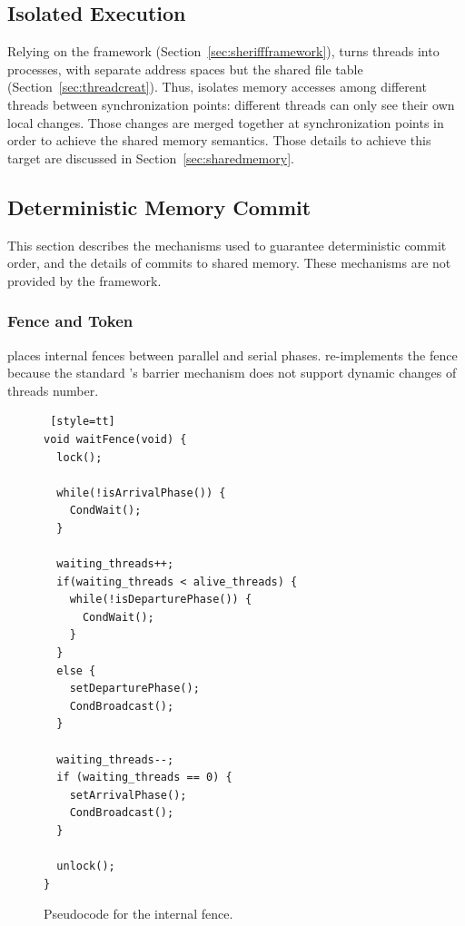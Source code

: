 \subsection{Isolated Execution}
\label{sec:threadsasprocs}

Relying on the \sheriff{} framework (Section~\ref{sec:sheriffframework}), \dthreads{} turns threads into processes, with separate address spaces but the shared file table (Section~\ref{sec:threadcreat}). Thus, \dthreads{} isolates memory accesses among different threads between synchronization points: different threads can only see their own local changes. Those changes are merged together at synchronization points in order to achieve the shared memory semantics. Those details to achieve this target are discussed in Section~\ref{sec:sharedmemory}.  

\subsection{Deterministic Memory Commit}
\label{sec:sharedmem}

This section describes the mechanisms used to guarantee deterministic commit order, and the details of commits to shared memory. These mechanisms are not provided by the \sheriff{} framework.   

\subsubsection{Fence and Token}
\label{sec:schedule}

\dthreads{} places internal fences between parallel and serial phases. \dthreads{} re-implements the fence because the standard \pthreads{}'s barrier mechanism does not support dynamic changes of threads number. 

\begin{figure}
\begin{lstlisting} [style=tt]
void waitFence(void) {
  lock();
	
  while(!isArrivalPhase()) { 
    CondWait();
  }

  waiting_threads++;
  if(waiting_threads < alive_threads) {
    while(!isDeparturePhase()) {
      CondWait();
    }
  } 
  else {
    setDeparturePhase();
    CondBroadcast();
  }

  waiting_threads--;
  if (waiting_threads == 0) {
    setArrivalPhase();
    CondBroadcast();
  }

  unlock();
}

\end{lstlisting}
\caption{Pseudocode for the internal fence.\label{fig:internalFence}}
\end{figure}


